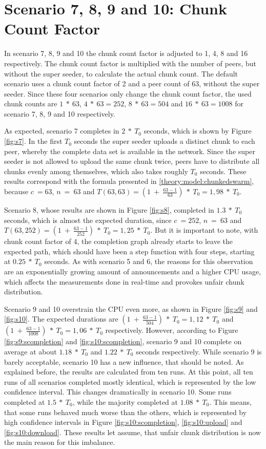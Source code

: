 \pagebreak
\section{Scenario 7, 8, 9 and 10: Chunk Count Factor}
\label{evaluation:78910}

In scenario 7, 8, 9 and 10 the chunk count factor is adjusted to 1, 4, 8 and 16 respectively. The chunk count factor is multiplied with the number of peers, but without the super seeder, to calculate the actual chunk count. The default scenario uses a chunk count factor of 2 and a peer count of 63, without the super seeder. Since these four scenarios only change the chunk count factor, the used chunk counts are $1\:*\:63$, $4\:*\:63=252$, $8\:*\:63=504$ and $16\:*\:63=1008$ for scenario 7, 8, 9 and 10 respectively.   

As expected, scenario 7 completes in $2\:*\:T_0$ seconds, which is shown by Figure \ref{fig:s7}. In the first $T_0$ seconds the super seeder uploads a distinct chunk to each peer, whereby the complete data set is available in the network. Since the super seeder is not allowed to upload the same chunk twice, peers have to distribute all chunks evenly among themselves, which also takes roughly $T_0$ seconds. These results correspond with the formula presented in \ref{theory:model:chunkedswarm}, because $c\:=63$, $n\:=\:63$ and $T(63, 63) = (1\:+\:\frac{63-1}{63})\:*\:T_0 = 1,98\:*\:T_0$.

Scenario 8, whose results are shown in Figure \ref{fig:s8}, completed in $1.3\:*\:T_0$ seconds, which is almost the expected duration, since $c\:=252$, $n\:=\:63$ and $T(63, 252) = (1\:+\:\frac{63-1}{252})\:*\:T_0 = 1,25\:*\:T_0$. But it is important to note, with chunk count factor of 4, the completion graph already starts to leave the expected path, which should have been a step function with four steps, starting at $0.25\:*\:T_0$ seconds. As with scenario 5 and 6, the reasons for this observation are an exponentially growing amount of announcements and a higher CPU usage, which affects the measurements done in real-time and provokes unfair chunk distribution.

Scenario 9 and 10 overstrain the CPU even more, as shown in Figure \ref{fig:s9} and \ref{fig:s10}. The expected durations are $(1\:+\:\frac{63-1}{504})\:*\:T_0 = 1,12\:*\:T_0$ and $(1\:+\:\frac{63-1}{1008})\:*\:T_0 = 1,06\:*\:T_0$ respectively. However, according to Figure \ref{fig:s9:scompletion} and \ref{fig:s10:scompletion}, scenario 9 and 10 complete on average at about $1.18\:*\:T_0$ and $1.22\:*\:T_0$ seconds respectively. While scenario 9 is barely acceptable, scenario 10 has a new influence, that should be noted. As explained before, the results are calculated from ten runs. At this point, all ten runs of all scenarios completed mostly identical, which is represented by the low confidence interval. This changes dramatically in scenario 10. Some runs completed at $1.5\:*\:T_0$, while the majority completed at $1.08\:*\:T_0$. This means, that some runs behaved much worse than the others, which is represented by high confidence intervals in Figure \ref{fig:s10:scompletion}, \ref{fig:s10:upload} and \ref{fig:s10:download}. These results let assume, that unfair chunk distribution is now the main reason for this imbalance.

